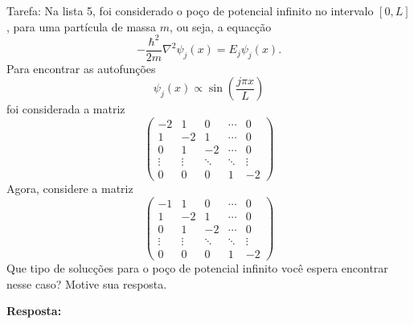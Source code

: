 \documentclass[12pt, a4paper]{article} %
\begin{document}
        Tarefa: Na lista 5, foi considerado o po\c{c}o de potencial infinito no intervalo $[0, L]$, para uma part\'icula de massa $m$, ou seja, a equac\c{c}\~ao
        \begin{equation}
            -\frac{\hbar^{2}}{2m}\nabla^{2}\psi_{j}(x)=E_{j}\psi_{j}(x).
        \end{equation}
        Para encontrar as autofun\c{c}\~oes
        \begin{equation*}
            \psi_{j}(x) \propto \sin\left(\frac{j\pi x}{L}\right)
        \end{equation*}
         foi considerada a matriz
        \[
        \begin{pmatrix}
            -2 & 1 & 0 & \cdots & 0 \\
            1 & -2 & 1 & \cdots & 0 \\
            0 & 1 & -2 & \cdots & 0 \\
            \vdots & \vdots & \ddots & \ddots & \vdots \\
            0 & 0 & 0 & 1 & -2
        \end{pmatrix}
        \]
        Agora, considere a matriz
        \begin{equation}
        \begin{pmatrix}
            -1 & 1 & 0 & \cdots & 0 \\
            1 & -2 & 1 & \cdots & 0 \\
            0 & 1 & -2 & \cdots & 0 \\
            \vdots & \vdots & \ddots & \ddots & \vdots \\
            0 & 0 & 0 & 1 & -2
        \end{pmatrix}
        \end{equation}
        Que tipo de soluc\c{c}\~oes para o po\c{c}o de potencial infinito voc\^e espera encontrar nesse caso? Motive sua resposta.
        
        \textbf{Resposta:}
\end{document}
